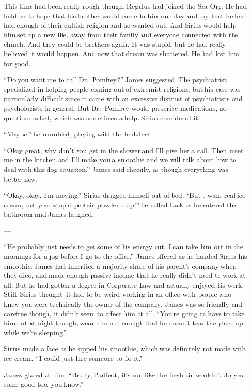 \documentclass[12pt,twoside,openright]{memoir}
\begin{document}
This time had been really rough though. Regulus had joined the Sea Org. He had held on to hope that his brother would come to him one day and say that he had had enough of their cultish religion and he wanted out. And Sirius would help him set up a new life, away from their family and everyone connected with the church. And they could be brothers again. It was stupid, but he had really believed it would happen. And now that dream was shattered. He had lost him for good.

``Do you want me to call Dr.\ Pomfrey?'' James suggested. The psychiatrist specialized in helping people coming out of extremist religions, but his case was particularly difficult since it came with an excessive distrust of psychiatrists and psychologists in general. But Dr.\ Pomfrey would prescribe medications, no questions asked, which was sometimes a help. Sirius considered it. 

``Maybe.'' he mumbled, playing with the bedsheet. 

``Okay great, why don't you get in the shower and I'll give her a call. Then meet me in the kitchen and I'll make you a smoothie and we will talk about how to deal with this dog situation.'' James said cheerily, as though everything was better now. 

``Okay, okay. I'm moving.'' Sirius dragged himself out of bed. ``But I want real ice cream, not your stupid protein powder crap!'' he called back as he entered the bathroom and James laughed.

---

``He probably just needs to get some of his energy out. I can take him out in the mornings for a jog before I go to the office.'' James offered as he handed Sirius his smoothie. James had inherited a majority share of his parent's company when they died, and made enough passive income that he really didn't need to work at all. But he had gotten a degree in Corporate Law and actually enjoyed his work. Still, Sirius thought, it had to be weird working in an office with people who knew you were technically the owner of the company. James was so friendly and carefree though, it didn't seem to affect him at all. ``You're going to have to take him out at night though, wear him out enough that he doesn't tear the place up while we're sleeping.''

Sirius made a face as he sipped his smoothie, which was definitely not made with ice cream. ``I could just hire someone to do it.''

James glared at him. ``Really, Padfoot, it's not like the fresh air wouldn't do you some good too, you know.''
\end{document}
